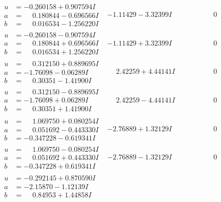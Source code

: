 \documentclass[1p]{elsarticle_modified}
\theoremstyle{definition}
\begin{document}
$$\begin{array}{c|c|c}
\begin{aligned}
u &= -0.260158 + 0.907594 I \\
a &= \phantom{-}0.180844 - 0.696566 I \\
b &= \phantom{-}0.016534 - 1.256220 I\end{aligned}
 & -1.11429 - 3.32399 I & \phantom{-0.000000 } 0 \\ \hline\begin{aligned}
u &= -0.260158 - 0.907594 I \\
a &= \phantom{-}0.180844 + 0.696566 I \\
b &= \phantom{-}0.016534 + 1.256220 I\end{aligned}
 & -1.11429 + 3.32399 I & \phantom{-0.000000 } 0 \\ \hline\begin{aligned}
u &= \phantom{-}0.312150 + 0.889695 I \\
a &= -1.76098 - 0.06289 I \\
b &= \phantom{-}0.30351 - 1.41900 I\end{aligned}
 & \phantom{-}2.42259 + 4.44141 I & \phantom{-0.000000 } 0 \\ \hline\begin{aligned}
u &= \phantom{-}0.312150 - 0.889695 I \\
a &= -1.76098 + 0.06289 I \\
b &= \phantom{-}0.30351 + 1.41900 I\end{aligned}
 & \phantom{-}2.42259 - 4.44141 I & \phantom{-0.000000 } 0 \\ \hline\begin{aligned}
u &= \phantom{-}1.069750 + 0.080254 I \\
a &= \phantom{-}0.051692 - 0.443330 I \\
b &= -0.347228 - 0.619341 I\end{aligned}
 & -2.76889 + 1.32129 I & \phantom{-0.000000 } 0 \\ \hline\begin{aligned}
u &= \phantom{-}1.069750 - 0.080254 I \\
a &= \phantom{-}0.051692 + 0.443330 I \\
b &= -0.347228 + 0.619341 I\end{aligned}
 & -2.76889 - 1.32129 I & \phantom{-0.000000 } 0 \\ \hline\begin{aligned}
u &= -0.292145 + 0.870590 I \\
a &= -2.15870 - 1.12139 I \\
b &= \phantom{-}0.84953 + 1.44858 I\end{aligned}

\end{array}$$
\end{document}
